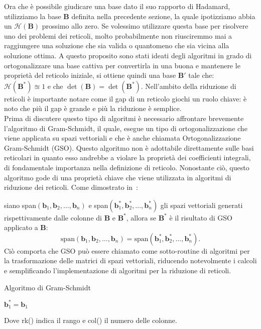 Ora che è possibile giudicare una base dato il suo rapporto di Hadamard, utilizziamo la base
$\mathbf{B}$ definita nella precedente sezione, la quale ipotizziamo abbia un 
$\mathcal{H}(\mathbf{B})$ prossimo allo zero. Se volessimo utilizzare questa base per risolvere
uno dei problemi dei reticoli, molto probabilmente non riusciremmo mai a raggiungere una soluzione
che sia valida o quantomeno che sia vicina alla soluzione ottima.
A questo proposito sono stati ideati degli algoritmi in grado di ortogonalizzare una base
cattiva per convertirla in una buona e mantenere le proprietà del reticolo iniziale, si
ottiene quindi una base $\mathbf{B'}$ tale che: 
$\mathcal{H}(\mathbf{B}^*) \approxeq 1$ e che $\det(\mathbf{B}) = \det(\mathbf{B}^*)$.
Nell'ambito della riduzione di reticoli è importante notare come il gap di un reticolo giochi
un ruolo chiave: è noto che più il gap è grande e più la riduzione è semplice.\\

Prima di discutere questo tipo di algoritmi è necessario affrontare brevemente 
l'algoritmo di Gram-Schmidt, il quale, esegue un tipo di ortogonalizzazione che viene applicata
su spazi vettoriali e che è anche chiamata Ortogonalizzazione Gram-Schmidt (GSO).
Questo algoritmo non è adottabile direttamente sulle basi reticolari in quanto esso andrebbe a 
violare la proprietà dei coefficienti integrali, di fondamentale importanza nella
definizione di reticolo. Nonostante ciò, questo algoritmo gode di una proprietà chiave che
viene utilizzata in algoritmi di riduzione dei reticoli. Come dimostrato in~\cite[Teorema 7.13]{HDMRD08}:

siano span$(\mathbf{b}_1, \mathbf{b}_2, \dots, \mathbf{b}_n)$ e 
span$(\mathbf{b}_1^*, \mathbf{b}_2^*, \dots, \mathbf{b}_n^*)$ 
gli spazi vettoriali generati rispettivamente dalle colonne di $\mathbf{B}$ e $\mathbf{B}^*$,
allora se $\mathbf{B}^*$ è il risultato di GSO applicato a $\mathbf{B}$:
\[
\text{span}(\mathbf{b}_1, \mathbf{b}_2, \dots, \mathbf{b}_n) =
\text{span}(\mathbf{b}_1^*, \mathbf{b}_2^*, \dots, \mathbf{b}_n^*).
\]
Ciò comporta che GSO può essere chiamato come sotto-routine di algoritmi per la trasformazione
delle matrici di spazi vettoriali, riducendo notevolmente i calcoli e semplificando l'implementazione
di algoritmi per la riduzione di reticoli.

\begin{algorithm}
    \caption{Algoritmo di Gram-Schmidt}
    \label{alg:one}
    \large
    \DontPrintSemicolon
    $\mathbf{b}_1^* = \mathbf{b}_1$\;
\end{algorithm}
Dove rk() indica il rango e col() il numero delle colonne. 


